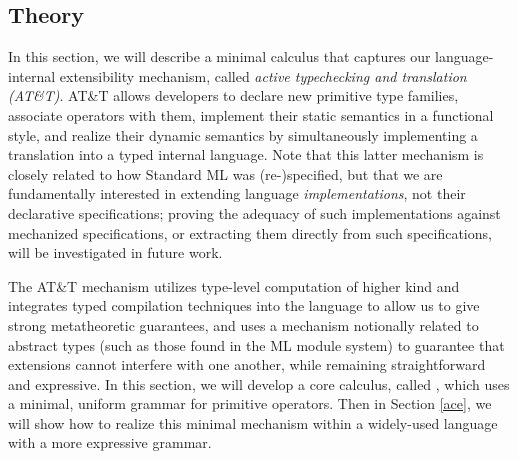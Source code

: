\subsection{Theory}\label{atlam}
In this section, we will describe a minimal calculus that captures our language-internal extensibility mechanism,  called \emph{active typechecking and translation (AT\&T)}. AT\&T allows developers to declare new primitive type families, associate operators with them, implement their static semantics in a functional style, and realize their dynamic semantics by simultaneously implementing a translation into a typed internal language. Note that this latter mechanism is closely related to how Standard ML was (re-)specified, but that we are fundamentally interested in extending language \emph{implementations}, not their  declarative specifications; proving the adequacy of such implementations against mechanized specifications, or extracting them directly from such specifications, will be investigated in future work.

The AT\&T mechanism utilizes type-level computation of higher kind and integrates typed compilation techniques into the language to allow us to give strong metatheoretic guarantees,  and uses a mechanism notionally related to abstract types (such as those found in the ML module system) to guarantee that extensions cannot interfere with one another,  while remaining straightforward and expressive. In this section, we will develop a core calculus, called \atlam, which uses a minimal, uniform grammar for primitive operators. Then in Section \ref{ace}, we will show how to realize this minimal mechanism within a widely-used language with a more expressive grammar.


